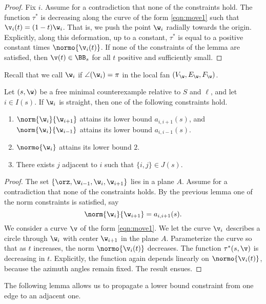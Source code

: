 \begin{proof} Fix $i$.  Assume for a contradiction that none of the
constraints hold.
The function $\tau^*$ is decreasing along
the curve of the form \eqref{eqn:move1} such that
$\v_i(t)=(1-t) \w_i$.
That is, we push the point $\w_i$ radially towards the origin.
Explicitly, along this deformation, up to a constant, $\tau^*$ is equal
to a positive constant times $\normo{\v_i(t)}$.
If none of the constraints of the lemma are satisfied, then
$\v(t)\in \BB_s$ for all $t$ positive and sufficiently
small.
\end{proof}

Recall that we call $\w_i$ 
if $\angle(\w_i)=\pi$ in the local fan $(V_\w,E_\w,F_\w)$.


\begin{lemma} \label{lemma:imj}
  Let $(s,\w)$ be a free minimal counterexample relative to $S$ and
  $\ell$,  and let $i\in I(s)$.  If $\w_i$ is straight, then one of the
  following constraints hold.
\begin{enumerate}
\item $\norm{\w_i}{\w_{i+1}}$ attains its lower bound $a_{i,i+1}(s)$, and
 $\norm{\w_i}{\w_{i-1}}$ attains its lower bound $a_{i,i-1}(s)$.
\item $\normo{\w_i}$ attains its lower bound $2$.
\item There exists $j$ adjacent to $i$ such that $\{i,j\}\in J(s)$.
\end{enumerate}
\end{lemma}

\begin{proof}  The set $\{\orz,\w_{i-1},\w_i,\w_{i+1}\}$ lies in a plane $A$.
Assume for a contradiction that none of the constraints holds.  By the previous
lemma one of the norm constraints is satisfied, say
\[
\norm{\w_i}{\w_{i+1}}=a_{i,i+1}(s).
\]
We consider a  curve $\v$ of the form \eqref{eqn:move1}.
We let the curve $\v_i$ describes a circle through
 $\w_i$ with center $\w_{i+1}$ in the plane $A$.  Parameterize the curve
so that as $t$ increases, the norm $\normo{\v_i(t)}$ decreases.
The function $\tau^*(s,\v)$ is decreasing in $t$.  Explicitly, the
function again depends linearly on $\normo{\v_i(t)}$, because
the azimuth angles remain fixed.  The result ensues.
\end{proof}

The following lemma allows us to propagate a lower bound constraint
from one edge to an adjacent one.


